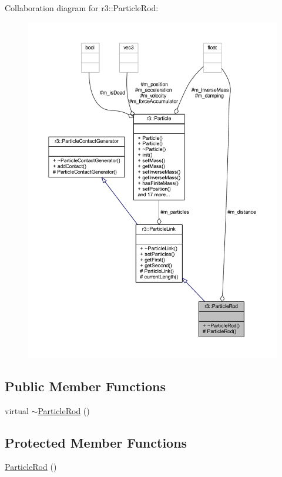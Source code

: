 Collaboration diagram for r3\+:\+:Particle\+Rod\+:\nopagebreak
\begin{figure}[H]
\begin{center}
\leavevmode
\includegraphics[width=350pt]{classr3_1_1_particle_rod__coll__graph}
\end{center}
\end{figure}
\subsection*{Public Member Functions}
\begin{DoxyCompactItemize}
\item 
virtual \mbox{\hyperlink{classr3_1_1_particle_rod_aa6fd377f7694d3d64ef4135e6bd4299e}{$\sim$\+Particle\+Rod}} ()
\end{DoxyCompactItemize}
\subsection*{Protected Member Functions}
\begin{DoxyCompactItemize}
\item 
\mbox{\hyperlink{classr3_1_1_particle_rod_a5ceef2a44c266092396799440c9c674f}{Particle\+Rod}} ()
\end{DoxyCompactItemize}
